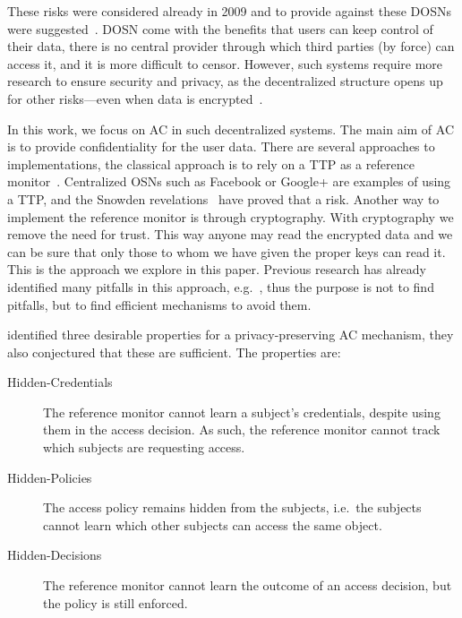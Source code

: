 These risks were considered already in 2009 and to provide against these 
\acp{DOSN} were suggested~\cite[e.g.][]{peerson}.
\ac{DOSN} come with the benefits that users can keep control of their data, 
there is no central provider through which third parties (by force) can access 
it, and it is more difficult to censor.
However, such systems require more research to ensure security and privacy, as 
the decentralized structure opens up for other risks---even when data is 
encrypted~\cite{DevilInMetadata}.

In this work, we focus on \ac{AC} in such decentralized systems.
The main aim of \ac{AC} is to provide confidentiality for the user data.
There are several approaches to implementations, the classical approach is to 
rely on a \ac{TTP} as a reference monitor~\cite{AccessControl}.
Centralized \acp{OSN} such as Facebook or Google+ are examples of using 
a \ac{TTP}, and the Snowden revelations~\cite{prism} have proved that a risk.
Another way to implement the reference monitor is through cryptography.
With cryptography we remove the need for trust.
This way anyone may read the encrypted data and we can be sure that only those 
to whom we have given the proper keys can read it.
This is the approach we explore in this paper.
Previous research has already identified many pitfalls in this approach, 
e.g.~\cite{DevilInMetadata}, thus the purpose is not to find pitfalls, but to 
find efficient mechanisms to avoid them.

\citet{TowardsPPACwHPHCHD} identified three desirable properties for 
a privacy-preserving \ac{AC} mechanism, they also conjectured that these are 
sufficient.
The properties are:
\begin{description}
  \item[Hidden-Credentials] The reference monitor cannot learn a subject's 
    credentials, despite using them in the access decision.
    As such, the reference monitor cannot track which subjects are requesting 
    access.
  \item[Hidden-Policies] The access policy remains hidden from the subjects, 
    i.e.\ the subjects cannot learn which other subjects can access the same 
    object.
  \item[Hidden-Decisions] The reference monitor cannot learn the outcome of an 
    access decision, but the policy is still enforced.
\end{description}

